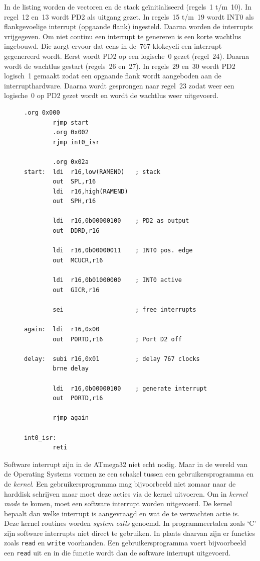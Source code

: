 In de listing worden de vectoren en de stack ge\"initialiseerd (regels~1
t/m~10). In regel~12 en~13 wordt PD2 als uitgang gezet. In regels~15
t/m~19 wordt INT0 als flankgevoelige interrupt (opgaande flank) ingesteld.
Daarna worden de interrupts vrijgegeven. Om niet continu een interrupt te
genereren is een korte wachtlus ingebouwd. Die zorgt ervoor dat eens in
de~767 klokcycli een interrupt gegenereerd wordt. Eerst wordt PD2 op een
logische~0 gezet (regel~24). Daarna wordt de wachtlus gestart (regels~26
en~27). In regels~29 en~30 wordt PD2 logisch~1 gemaakt zodat een opgaande
flank wordt aangeboden aan de interrupthardware. Daarna wordt gesprongen
naar regel~23 zodat weer een logische~0 op PD2 gezet wordt en wordt de
wachtlus weer uitgevoerd.

\begin{figure}[!ht]
\begin{lstlisting}[language=AVRassembler,caption=Externe interrupt INT0 wordt gebruikt als software interrupt.,label=cod:intint0swint]
		.org 0x000
		rjmp start
		.org 0x002
		rjmp int0_isr

		.org 0x02a
start:	ldi  r16,low(RAMEND)   ; stack
		out  SPL,r16
		ldi  r16,high(RAMEND)
		out  SPH,r16

		ldi  r16,0b00000100    ; PD2 as output
		out  DDRD,r16

		ldi  r16,0b00000011    ; INT0 pos. edge
		out  MCUCR,r16

		ldi  r16,0b01000000    ; INT0 active
		out  GICR,r16

		sei                    ; free interrupts

again:	ldi  r16,0x00
        out  PORTD,r16         ; Port D2 off

delay:	subi r16,0x01          ; delay 767 clocks
		brne delay

		ldi  r16,0b00000100    ; generate interrupt
		out  PORTD,r16

		rjmp again

int0_isr:
		reti
\end{lstlisting}
\end{figure}

Software interrupt zijn in de ATmega32 niet echt nodig. Maar in de wereld
van de Operating Systems vormen ze een schakel tussen een gebruikersprogramma
en de \textsl{kernel}. Een gebruikersprogramma mag bijvoorbeeld niet zomaar
naar de harddisk schrijven maar moet deze acties via de kernel uitvoeren. Om
in \textsl{kernel mode} te komen, moet een software interrupt worden
uitgevoerd. De kernel bepaalt dan welke interrupt is aangevraagd en wat de te
verwachten actie is. Deze kernel routines worden \textsl{system calls} genoemd.
In programmeertalen zoals `C' zijn software interrupts niet direct te gebruiken.
In plaats daarvan zijn er functies zoals \lstinline|read| en \lstinline|write|
voorhanden. Een gebruikersprogramma voert bijvoorbeeld een \lstinline|read| uit
en in die functie wordt dan de software interrupt uitgevoerd.

